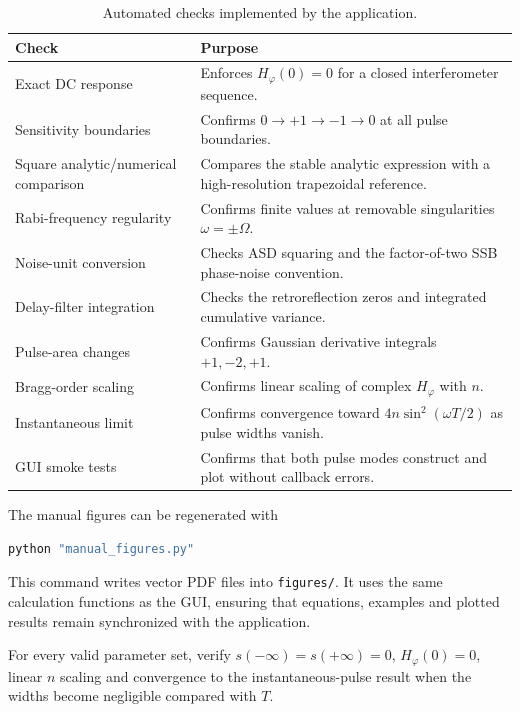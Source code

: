 \documentclass[11pt,a4paper]{article}
\newcommand{\Hphi}{H_{\varphi}}
\begin{document}
\begin{table}[H]
\centering
\caption{Automated checks implemented by the application.}
\begin{tabularx}{\textwidth}{@{}lX@{}}
\toprule
Check & Purpose \\
\midrule
Exact DC response & Enforces $\Hphi(0)=0$ for a closed interferometer sequence. \\
Sensitivity boundaries & Confirms $0\rightarrow+1\rightarrow-1\rightarrow0$ at all pulse boundaries. \\
Square analytic/numerical comparison & Compares the stable analytic expression with a high-resolution trapezoidal reference. \\
Rabi-frequency regularity & Confirms finite values at removable singularities $\omega=\pm\Omega$. \\
Noise-unit conversion & Checks ASD squaring and the factor-of-two SSB phase-noise convention. \\
Delay-filter integration & Checks the retroreflection zeros and integrated cumulative variance. \\
Pulse-area changes & Confirms Gaussian derivative integrals $+1,-2,+1$. \\
Bragg-order scaling & Confirms linear scaling of complex $\Hphi$ with $n$. \\
Instantaneous limit & Confirms convergence toward $4n\sin^2(\omega T/2)$ as pulse widths vanish. \\
GUI smoke tests & Confirms that both pulse modes construct and plot without callback errors. \\
\bottomrule
\end{tabularx}
\end{table}

The manual figures can be regenerated with
\begin{lstlisting}[language=bash]
python "manual_figures.py"
\end{lstlisting}
This command writes vector PDF files into \texttt{figures/}. It uses the same calculation functions as the GUI, ensuring that equations, examples and plotted results remain synchronized with the application.

\begin{checkbox}
For every valid parameter set, verify $s(-\infty)=s(+\infty)=0$, $\Hphi(0)=0$, linear $n$ scaling and convergence to the instantaneous-pulse result when the widths become negligible compared with $T$.
\end{checkbox}
\end{document}
